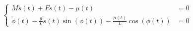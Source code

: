 \[
\begin{cases}
  M \ddot{s}(t) + F \dot{s}(t) - \mu(t) & = 0 \\
    \ddot{\phi}(t) - \frac{g}{L} \ddot{s}(t) \sin({\phi}(t)) - \frac{\mu(t)}{L} \cos(\phi(t)) & = 0
\end{cases}
\]